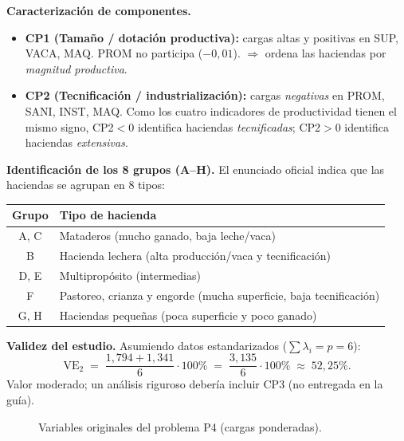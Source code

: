 \documentclass[11pt,a4paper]{article}
\newcommand{\arr}[4]{%
  \draw[-{Stealth[length=2mm]},thick,usachteal!80!black] (axis cs:0,0) -- (axis cs:#1,#2);%
  \node[anchor=#4,font=\small] at (axis cs:#1,#2) {\textbf{#3}};%
}
\begin{document}
\begin{solbox}
\textbf{Caracterización de componentes.}
\begin{itemize}[noitemsep,leftmargin=*]
\item \textbf{CP1 (Tamaño / dotación productiva):} cargas altas y positivas en SUP, VACA, MAQ. PROM no participa ($-0{,}01$). $\Rightarrow$ ordena las haciendas por \emph{magnitud productiva}.
\item \textbf{CP2 (Tecnificación / industrialización):} cargas \emph{negativas} en PROM, SANI, INST, MAQ. Como los cuatro indicadores de productividad tienen el mismo signo, CP2$<0$ identifica haciendas \emph{tecnificadas}; CP2$>0$ identifica haciendas \emph{extensivas}.
\end{itemize}

\textbf{Identificación de los 8 grupos (A–H).} El enunciado oficial indica que las haciendas se agrupan en 8 tipos:

\begin{center}\small
\begin{tabular}{cl}\toprule
Grupo & Tipo de hacienda\\\midrule
A, C & Mataderos (mucho ganado, baja leche/vaca)\\
B    & Hacienda lechera (alta producción/vaca y tecnificación)\\
D, E & Multipropósito (intermedias)\\
F    & Pastoreo, crianza y engorde (mucha superficie, baja tecnificación)\\
G, H & Haciendas pequeñas (poca superficie y poco ganado)\\\bottomrule
\end{tabular}\end{center}

\textbf{Validez del estudio.} Asumiendo datos estandarizados ($\sum\lambda_i=p=6$):
\[
\mathrm{VE}_2 \;=\; \frac{1{,}794+1{,}341}{6}\cdot 100\% \;=\; \frac{3{,}135}{6}\cdot 100\% \;\approx\; \boxed{52{,}25\%}.
\]
Valor moderado; un análisis riguroso debería incluir CP3 (no entregada en la guía).
\end{solbox}

\begin{figure}[H]
\centering
{}
\caption{Variables originales del problema P4 (cargas ponderadas).}
\end{figure}
\end{document}
